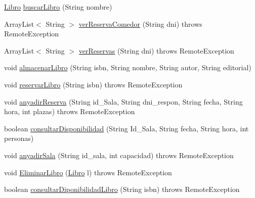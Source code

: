 \begin{DoxyCompactItemize}
\item 
\mbox{\hyperlink{classes_1_1deusto_1_1spq_1_1biblioteca_1_1data_1_1_libro}{Libro}} \mbox{\hyperlink{classes_1_1deusto_1_1spq_1_1biblioteca_1_1remote_1_1_biblioteca_a5d8bbdd7819a301e1a7bfee2795b9040}{buscar\+Libro}} (String nombre)
\item 
Array\+List$<$ String $>$ \mbox{\hyperlink{classes_1_1deusto_1_1spq_1_1biblioteca_1_1remote_1_1_biblioteca_a4bbd6c5f2df8f41fd0b5fb61564a1bfd}{ver\+Reserva\+Comedor}} (String dni)  throws Remote\+Exception 
\item 
Array\+List$<$ String $>$ \mbox{\hyperlink{classes_1_1deusto_1_1spq_1_1biblioteca_1_1remote_1_1_biblioteca_a809e1bd178fbd41b865f827fd074e8c4}{ver\+Reservas}} (String dni)  throws Remote\+Exception 
\item 
void \mbox{\hyperlink{classes_1_1deusto_1_1spq_1_1biblioteca_1_1remote_1_1_biblioteca_ae6389acf6f1cab24aa1bb55b38c010b0}{almacenar\+Libro}} (String isbn, String nombre, String autor, String editorial)
\item 
void \mbox{\hyperlink{classes_1_1deusto_1_1spq_1_1biblioteca_1_1remote_1_1_biblioteca_aabb7d3ecb5206da47fc6c4fa315e4c6e}{reservar\+Libro}} (String isbn)  throws Remote\+Exception 
\item 
void \mbox{\hyperlink{classes_1_1deusto_1_1spq_1_1biblioteca_1_1remote_1_1_biblioteca_a14548a38ca53ad1037d16687093e4597}{anyadir\+Reserva}} (String id\+\_\+\+Sala, String dni\+\_\+respon, String fecha, String hora, int plazas)  throws Remote\+Exception 
\item 
boolean \mbox{\hyperlink{classes_1_1deusto_1_1spq_1_1biblioteca_1_1remote_1_1_biblioteca_a447029538e7996f0ea4faafff1c4351e}{consultar\+Disponibilidad}} (String Id\+\_\+\+Sala, String fecha, String hora, int personas)
\item 
void \mbox{\hyperlink{classes_1_1deusto_1_1spq_1_1biblioteca_1_1remote_1_1_biblioteca_ada19ff59e03ece674f64ac191ba87c29}{anyadir\+Sala}} (String id\+\_\+sala, int capacidad)  throws Remote\+Exception 
\item 
void \mbox{\hyperlink{classes_1_1deusto_1_1spq_1_1biblioteca_1_1remote_1_1_biblioteca_aec13dff9f9d789b103b51d243e52832e}{Eliminar\+Libro}} (\mbox{\hyperlink{classes_1_1deusto_1_1spq_1_1biblioteca_1_1data_1_1_libro}{Libro}} l)  throws Remote\+Exception 
\item 
boolean \mbox{\hyperlink{classes_1_1deusto_1_1spq_1_1biblioteca_1_1remote_1_1_biblioteca_a43429c3eea8c1a6a49b6994439606ee3}{consultar\+Diponibilidad\+Libro}} (String isbn)  throws Remote\+Exception 

\end{DoxyCompactItemize}
